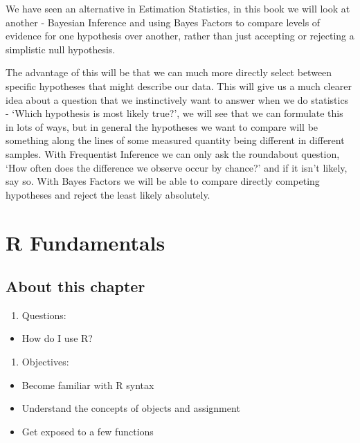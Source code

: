 \documentclass[
]{book}
\providecommand{\tightlist}{%
  \setlength{\itemsep}{0pt}\setlength{\parskip}{0pt}}
\begin{document}
We have seen an alternative in Estimation Statistics, in this book we will look at another - Bayesian Inference and using Bayes Factors to compare levels of evidence for one hypothesis over another, rather than just accepting or rejecting a simplistic null hypothesis.

The advantage of this will be that we can much more directly select between specific hypotheses that might describe our data. This will give us a much clearer idea about a question that we instinctively want to answer when we do statistics - `Which hypothesis is most likely true?', we will see that we can formulate this in lots of ways, but in general the hypotheses we want to compare will be something along the lines of some measured quantity being different in different samples. With Frequentist Inference we can only ask the roundabout question, `How often does the difference we observe occur by chance?' and if it isn't likely, say so. With Bayes Factors we will be able to compare directly competing hypotheses and reject the least likely absolutely.

\hypertarget{r-fundamentals}{%
\chapter{R Fundamentals}\label{r-fundamentals}}

\hypertarget{about-this-chapter}{%
\section{About this chapter}\label{about-this-chapter}}

\begin{enumerate}
\def\labelenumi{\arabic{enumi}.}
\tightlist
\item
  Questions:
\end{enumerate}

\begin{itemize}
\tightlist
\item
  How do I use R?
\end{itemize}

\begin{enumerate}
\def\labelenumi{\arabic{enumi}.}
\setcounter{enumi}{1}
\tightlist
\item
  Objectives:
\end{enumerate}

\begin{itemize}
\tightlist
\item
  Become familiar with R syntax
\item
  Understand the concepts of objects and assignment
\item
  Get exposed to a few functions
\end{itemize}
\end{document}
